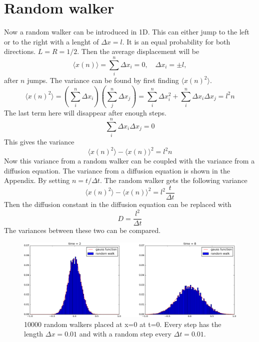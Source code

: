 \documentclass[%
twoside,                 %
final,                   %
chapterprefix=true,      %
open=right               %
10pt]{book}
\begin{document}
\section{Random walker}
Now a random walker can be introduced in 1D. This can either jump to the left or to the right with a lenght of $\Delta x = l$. It is an equal probability for both directions. $L=R=1/2$. Then the average displacement will be 
\begin{equation}
 \langle x(n) \rangle = \sum^n_i \Delta x_i = 0, \quad \Delta x_i = \pm l,
\end{equation}
after $n$ jumps. The variance can be found by first finding $\langle x(n)^2 \rangle$.
\begin{equation}
\langle x(n)^2 \rangle = \left(\sum^n_i \Delta x_i\right)\left(\sum^n_j \Delta x_j\right) = \sum^n_i \Delta x_i^2 + \sum^n_i \Delta x_i \Delta x_j = l^2n
\end{equation}
The last term here will disappear after enough steps.  
\begin{equation}
\sum^n_i \Delta x_i \Delta x_j = 0
\end{equation}
This gives the variance
\begin{equation}
\langle x(n)^2 \rangle-\langle x(n) \rangle^2 = l^2n
\end{equation}
Now this variance from a random walker can be coupled with the variance from a diffusion equation. The variance from a diffusion equation is shown in the Appendix. By setting $n = t/\Delta t$. The random walker gets the following variance
\begin{equation}
\langle x(n)^2 \rangle-\langle x(n) \rangle^2 = l^2\frac{t}{\Delta t}
\end{equation}
Then the diffusion constant in the diffusion equation can be replaced with
\begin{equation}
D = \frac{l^2}{\Delta t}
\end{equation}
The variances between these two can be compared.


\begin{figure}[ht]
  \centerline{\includegraphics[width=1.0\linewidth]{3_fig/random_compare.png}}
  \caption{
  \label{fig:gauss_random} 10000 random walkers placed at x=0 at t=0. Every step has the length $\Delta x = 0.01$ and with a random step every $\Delta t = 0.01$.
  }
\end{figure}
\end{document}
